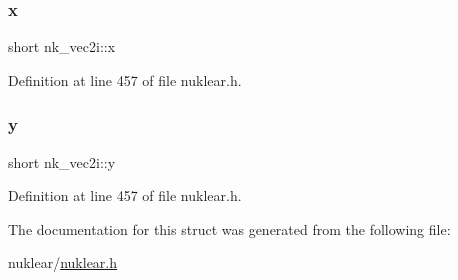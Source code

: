 \subsubsection{\texorpdfstring{x}{x}}
{\footnotesize\ttfamily short nk\+\_\+vec2i\+::x}



Definition at line 457 of file nuklear.\+h.

\mbox{\label{structnk__vec2i_a08585382e94fa8985f9084f68282f349}} 
\subsubsection{\texorpdfstring{y}{y}}
{\footnotesize\ttfamily short nk\+\_\+vec2i\+::y}



Definition at line 457 of file nuklear.\+h.



The documentation for this struct was generated from the following file\+:\begin{DoxyCompactItemize}
\item 
nuklear/\mbox{\hyperlink{nuklear_8h}{nuklear.\+h}}\end{DoxyCompactItemize}
